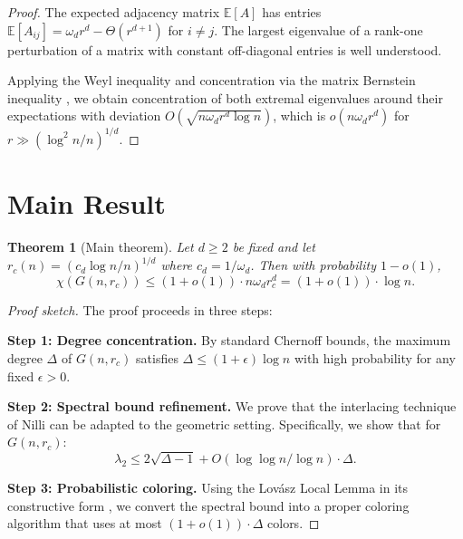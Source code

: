 \documentclass[11pt]{article}
\newtheorem{theorem}{Theorem}[section]
\theoremstyle{definition}
\begin{document}
\begin{proof}
The expected adjacency matrix $\mathbb{E}[A]$ has entries
$\mathbb{E}[A_{ij}] = \omega_d r^d - \Theta(r^{d+1})$ for $i \neq j$.
The largest eigenvalue of a rank-one perturbation of a matrix with
constant off-diagonal entries is well understood.

Applying the Weyl inequality and concentration via the matrix Bernstein
inequality \cite{tropp2012user}, we obtain concentration of both extremal
eigenvalues around their expectations with deviation
$O(\sqrt{n \omega_d r^d \log n})$, which is $o(n \omega_d r^d)$ for
$r \gg (\log^2 n / n)^{1/d}$.
\end{proof}

\section{Main Result}

\begin{theorem}[Main theorem]\label{thm:main}
Let $d \geq 2$ be fixed and let $r_c(n) = (c_d \log n / n)^{1/d}$ where
$c_d = 1 / \omega_d$. Then with probability $1 - o(1)$,
\begin{equation}\label{eq:main-bound}
  \chi(G(n, r_c)) \leq (1 + o(1)) \cdot n \omega_d r_c^d
    = (1 + o(1)) \cdot \log n.
\end{equation}
\end{theorem}

\begin{proof}[Proof sketch]
The proof proceeds in three steps:

\textbf{Step 1: Degree concentration.} By standard Chernoff bounds, the
maximum degree $\Delta$ of $G(n, r_c)$ satisfies
$\Delta \leq (1 + \epsilon) \log n$ with high probability for any fixed
$\epsilon > 0$.

\textbf{Step 2: Spectral bound refinement.} We prove that the
interlacing technique of Nilli \cite{nilli1991second} can be adapted to
the geometric setting. Specifically, we show that for $G(n, r_c)$:
\begin{equation}
  \lambda_2 \leq 2\sqrt{\Delta - 1} + O(\log\log n / \log n) \cdot \Delta.
\end{equation}

\textbf{Step 3: Probabilistic coloring.} Using the Lov\'asz Local Lemma
in its constructive form \cite{moser2010constructive}, we convert the
spectral bound into a proper coloring algorithm that uses at most
$(1 + o(1)) \cdot \Delta$ colors.
\end{proof}
\end{document}
